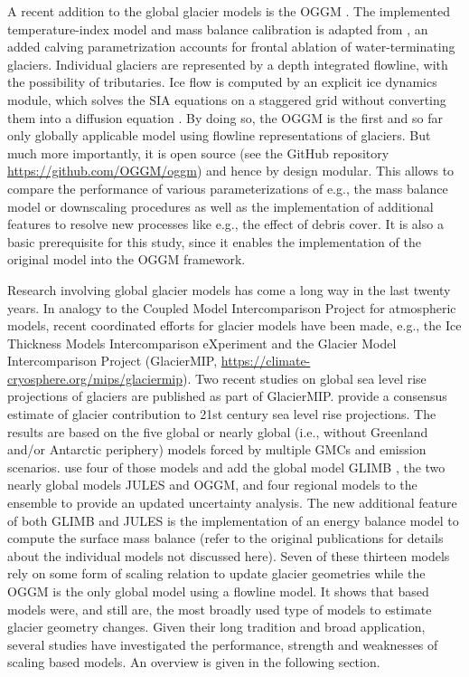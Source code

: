     A recent addition to the global glacier models is the OGGM \citep{Maussion2019}. The implemented temperature-index model and mass balance calibration is adapted from \citet{Marzeion2012b}, an added calving parametrization accounts for frontal ablation of water-terminating glaciers. Individual glaciers are represented by a depth integrated flowline, with the possibility of tributaries. Ice flow is computed by an explicit ice dynamics module, which solves the SIA equations on a staggered grid without converting them into a diffusion equation \citep{Maussion2019}. By doing so, the OGGM is the first and so far only globally applicable model using flowline representations of glaciers. 
    But much more importantly, it is open source (see the GitHub repository \url{https://github.com/OGGM/oggm}) and hence by design modular. This allows to compare the performance of various parameterizations of e.g., the mass balance model or downscaling procedures as well as the implementation of additional features to resolve new processes like e.g., the effect of debris cover. It is also a basic prerequisite for this study, since it enables the implementation of the original \citet{Marzeion2012b} model into the OGGM framework.

    Research involving global glacier models has come a long way in the last twenty years. In analogy to the Coupled Model Intercomparison Project \citep[CMIP, e.g.,][]{Eyring2016_CMIP} for atmospheric models, recent coordinated efforts for glacier models have been made, e.g., the Ice Thickness Models Intercomparison eXperiment \citep[\url{https://cryosphericsciences.org/activities/ice-thickness/}]{Farinotti2017, Farinotti2020} and the Glacier Model Intercomparison Project (GlacierMIP, \url{https://climate-cryosphere.org/mips/glaciermip}). Two recent studies on global sea level rise projections of glaciers are published as part of GlacierMIP. \citet{Hock2019a} provide a consensus estimate of glacier contribution to 21st century sea level rise projections. The results are based on the five global or nearly global (i.e., without Greenland and/or Antarctic periphery) models \citep{Slangen2012, Marzeion2012b, Giesen2013, Hirabayashi2013, Radic2014a, Huss2015} forced by multiple GMCs and emission scenarios. \citet{Marzeion2020} use four of those models and add the global model GLIMB \citep{Sakai2017}, the two nearly global models JULES \citep{Shannon2019} and OGGM, and four regional models to the ensemble to provide an updated uncertainty analysis. The new additional feature of both GLIMB and JULES is the implementation of an energy balance model to compute the surface mass balance (refer to the original publications for details about the individual models not discussed here). Seven of these thirteen models rely on some form of scaling relation to update glacier geometries while the OGGM is the only global model using a flowline model. It shows that \vas{} based models were, and still are, the most broadly used type of models to estimate glacier geometry changes. Given their long tradition and broad application, several studies have investigated the performance, strength and weaknesses of scaling based models. An overview is given in the following section.

